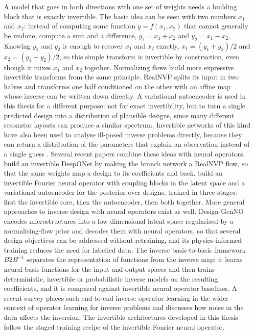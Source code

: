 A model that goes in both directions with one set of weights needs a building block that is exactly invertible. The basic idea can be seen with two numbers $x_1$ and $x_2$: instead of computing some function $y = f(x_1, x_2)$ that cannot generally be undone, compute a sum and a difference, $y_1 = x_1 + x_2$ and $y_2 = x_1 - x_2$. Knowing $y_1$ and $y_2$ is enough to recover $x_1$ and $x_2$ exactly, $x_1 = (y_1+y_2)/2$ and $x_2 = (y_1-y_2)/2$, so this simple transform is invertible by construction, even though it mixes $x_1$ and $x_2$ together. Normalizing flows build more expressive invertible transforms from the same principle. RealNVP \parencite{dinh2017realnvp} splits its input in two halves and transforms one half conditioned on the other with an affine map whose inverse can be written down directly. A variational autoencoder \parencite{kingma2014vae} is used in this thesis for a different purpose: not for exact invertibility, but to turn a single predicted design into a distribution of plausible designs, since many different resonator layouts can produce a similar spectrum. Invertible networks of this kind have also been used to analyse ill-posed inverse problems directly, because they can return a distribution of the parameters that explain an observation instead of a single guess \parencite{ardizzone2019inn}. Several recent papers combine these ideas with neural operators. \textcite{kaltenbach2023invertible} build an invertible DeepONet by making the branch network a RealNVP flow, so that the same weights map a design to its coefficients and back. \textcite{long2025invertiblefno} build an invertible Fourier neural operator with coupling blocks in the latent space and a variational autoencoder for the posterior over designs, trained in three stages: first the invertible core, then the autoencoder, then both together. More general approaches to inverse design with neural operators exist as well. Design-GenNO \parencite{zang2026designgenno} encodes microstructures into a low-dimensional latent space regularised by a normalising-flow prior and decodes them with neural operators, so that several design objectives can be addressed without retraining, and its physics-informed training reduces the need for labelled data. The inverse basis-to-basis framework $B2B^{-1}$ \parencite{thorpe2025generalizable} separates the representation of functions from the inverse map: it learns neural basis functions for the input and output spaces and then trains deterministic, invertible or probabilistic inverse models on the resulting coefficients, and it is compared against invertible neural operator baselines. A recent survey \parencite{nelsen2025operator} places such end-to-end inverse operator learning in the wider context of operator learning for inverse problems and discusses how noise in the data affects the inversion. The invertible architectures developed in this thesis follow the staged training recipe of the invertible Fourier neural operator.

